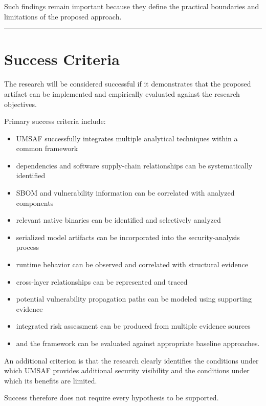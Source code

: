\documentclass[
  12pt,
  letterpaper,
  oneside]{report}
\providecommand{\tightlist}{%
  \setlength{\itemsep}{0pt}\setlength{\parskip}{0pt}}
\begin{document}
Such findings remain important because they define the practical
boundaries and limitations of the proposed approach.

\begin{center}\rule{0.5\linewidth}{0.5pt}\end{center}

\section{Success Criteria}\label{1110-success-criteria}

The research will be considered successful if it demonstrates that the
proposed artifact can be implemented and empirically evaluated against
the research objectives.

Primary success criteria include:

\begin{itemize}
\tightlist
\item
  UMSAF successfully integrates multiple analytical techniques within a
  common framework
\item
  dependencies and software supply-chain relationships can be
  systematically identified
\item
  SBOM and vulnerability information can be correlated with analyzed
  components
\item
  relevant native binaries can be identified and selectively analyzed
\item
  serialized model artifacts can be incorporated into the
  security-analysis process
\item
  runtime behavior can be observed and correlated with structural
  evidence
\item
  cross-layer relationships can be represented and traced
\item
  potential vulnerability propagation paths can be modeled using
  supporting evidence
\item
  integrated risk assessment can be produced from multiple evidence
  sources
\item
  and the framework can be evaluated against appropriate baseline
  approaches.
\end{itemize}

An additional criterion is that the research clearly identifies the
conditions under which UMSAF provides additional security visibility and
the conditions under which its benefits are limited.

Success therefore does not require every hypothesis to be supported.
\end{document}
